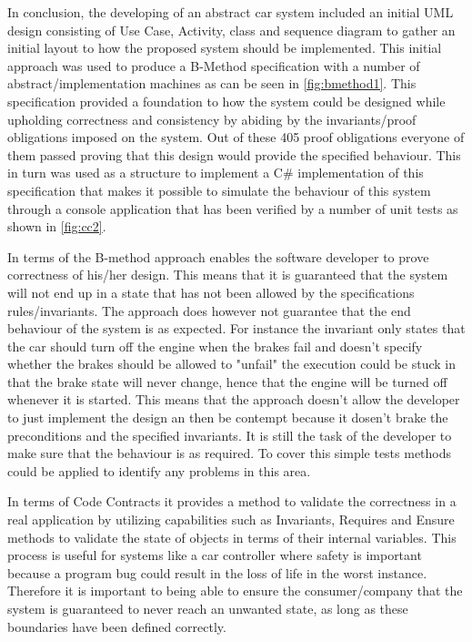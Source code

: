 \documentclass[12pt]{article}
\begin{document}
In conclusion, the developing of an abstract car system included an initial UML design consisting of Use Case, Activity, class and sequence diagram to gather an initial layout to how the proposed system should be implemented. This initial approach was used to produce a B-Method specification with a number of abstract/implementation machines as can be seen in \ref{fig:bmethod1}. This specification provided a foundation to how the system could be designed while upholding correctness and consistency by abiding by the invariants/proof obligations imposed on the system. Out of these 405 proof obligations everyone of them passed proving that this design would provide the specified behaviour. This in turn was used as a structure to implement a C\# implementation of this specification that makes it possible to simulate the behaviour of this system through a console application that has been verified by a number of unit tests as shown in \ref{fig:cc2}.

In terms of the B-method approach enables the software developer to prove correctness of his/her design. This means that it is guaranteed that the system will not end up in a state that has not been allowed by the specifications rules/invariants. The approach does however not guarantee that the end behaviour of the system is as expected. For instance the invariant only states that the car should turn off the engine when the brakes fail and doesn't specify whether the brakes should be allowed to "unfail" the execution could be stuck in that the brake state will never change, hence that the engine will be turned off whenever it is started. This means that the approach doesn't allow the developer to just implement the design an then be contempt because it dosen't brake the preconditions and the specified invariants. It is still the task of the developer to make sure that the behaviour is as required. To cover this simple tests methods could be applied to identify any problems in this area. 

In terms of Code Contracts it provides a method to validate the correctness in a real application by utilizing capabilities such as Invariants, Requires and Ensure methods to validate the state of objects in terms of their internal variables. This process is useful for systems like a car controller where safety is important because a program bug could result in the loss of life in the worst instance. Therefore it is important to being able to ensure the consumer/company that the system is guaranteed to never reach an unwanted state, as long as these boundaries have been defined correctly.




\end{document}
